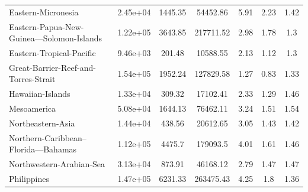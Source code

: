 \begin{table}[H]
{\begin{tabular}{lcccccc}
            \\
            Eastern-Micronesia                         & 2.45e+04 & 1445.35 &
            54452.86                                   &
            5.91                                       & 2.23     & 1.42
            \\
            Eastern-Papua-New-Guinea---Solomon-Islands & 1.22e+05 & 3643.85 &
            217711.52                                  &
            2.98                                       & 1.78     & 1.3
            \\
            Eastern-Tropical-Pacific                   & 9.46e+03 & 201.48  &
            10588.55                                   &
            2.13                                       & 1.12     & 1.3
            \\
            Great-Barrier-Reef-and-Torres-Strait       & 1.54e+05 & 1952.24 &
            127829.58                                  &
            1.27                                       & 0.83     & 1.33
            \\
            Hawaiian-Islands                           & 1.33e+04 & 309.32  &
            17102.41                                   &
            2.33                                       & 1.29     & 1.46
            \\
            Mesoamerica                                & 5.08e+04 & 1644.13 &
            76462.11                                   &
            3.24                                       & 1.51     & 1.54
            \\
            Northeastern-Asia                          & 1.44e+04 & 438.56  &
            20612.65                                   &
            3.05                                       & 1.43     & 1.42
            \\
            Northern-Caribbean--Florida---Bahamas      & 1.12e+05 & 4475.7  &
            179093.5                                   &
            4.01                                       & 1.61     & 1.46
            \\
            Northwestern-Arabian-Sea                   & 3.13e+04 & 873.91  &
            46168.12                                   &
            2.79                                       & 1.47     & 1.47
            \\
            Philippines                                & 1.47e+05 & 6231.33 &
            263475.43                                  &
            4.25                                       & 1.8      & 1.36

\end{tabular}}
\end{table}

